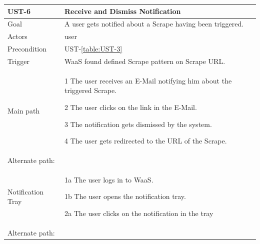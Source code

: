 \documentclass[titlepage, 12pt]{article}
\newenvironment{packed_itemize}{
  \vspace{-\topsep}
  \begin{itemize}
    \setlength{\itemsep}{1pt}
    \setlength{\parskip}{0pt}
    \setlength{\parsep}{0pt}
  }{\end{itemize}}
\begin{document}
\begin{table}[H]
  \begin{center}

    \begin{tabular}{p{4cm}|p{10cm}}
      \textbf{UST-6}                & \textbf{Receive and Dismiss Notification}                    \\
      \hline
      Goal                          & A user gets notified about a Scrape having been triggered.   \\
      \hline
      Actors                        & user                                                         \\
      \hline
      Precondition                  & UST-\ref{table:UST-3}                                        \\
      \hline
      Trigger                       & WaaS found defined Scrape pattern on Scrape URL.             \\
      \hline
      Main path                     &
      \begin{packed_itemize}
        \item [1] The user receives an E-Mail notifying him about the triggered Scrape.
        \item [2] The user clicks on the link in the E-Mail.
        \item [3] The notification gets dismissed by the system.
        \item [4] The user gets redirected to the URL of the Scrape.
      \end{packed_itemize}                                                                   \\
      \hline
      Alternate path:                                                                              \\
      Notification Tray             &
      \begin{packed_itemize}
        \item [1a] The user logs in to WaaS.
        \item [1b] The user opens the notification tray.
        \item [2a] The user clicks on the notification in the tray
      \end{packed_itemize}                                                                   \\
      \hline
      Alternate path:                                                                              \\

\end{tabular}
\end{center}
\end{table}
\end{document}
